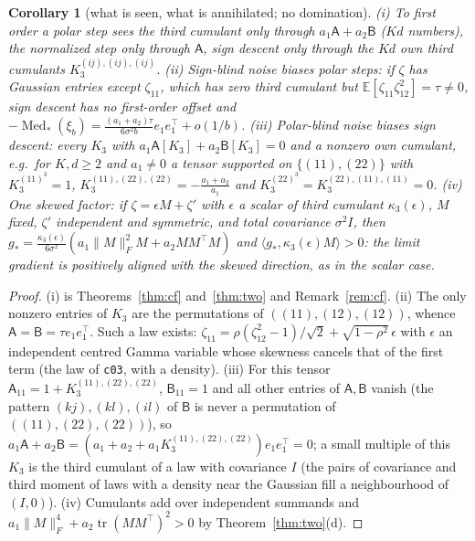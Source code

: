 \documentclass[10pt]{article}
\newtheorem{corollary}[theorem]{Corollary}
\theoremstyle{definition}
\theoremstyle{remark}
\newcommand{\E}{\mathbb{E}}
\newcommand{\nF}[1]{\|#1\|_{F}}
\newcommand{\inner}[2]{\langle #1, #2\rangle}
\newcommand{\tr}{\operatorname{tr}}
\newcommand{\Med}{\operatorname{Med}}
\newcommand{\cA}{\mathsf{A}}
\newcommand{\cB}{\mathsf{B}}
\begin{document}
\begin{corollary}[what is seen, what is annihilated; no domination]\label{cor:compare}
(i) To first order a polar step sees the third cumulant only through $a_1\cA+a_2\cB$ ($Kd$ numbers), the normalized step
only through $\cA$, sign descent only through the $Kd$ own third cumulants $K_3^{(ij),(ij),(ij)}$. (ii) \emph{Sign-blind
noise biases polar steps:} if $\zeta$ has Gaussian entries except $\zeta_{11}$, which has zero third cumulant but
$\E[\zeta_{11}\zeta_{12}^2]=\tau\ne0$, sign descent has no first-order offset and
$-\Med_\ast(\xi_b)=\frac{(a_1+a_2)\tau}{6\sigma^2b}e_1e_1^\top+o(1/b)$. (iii) \emph{Polar-blind noise biases sign descent:}
every $K_3$ with $a_1\cA[K_3]+a_2\cB[K_3]=0$ and a nonzero own cumulant, e.g.\ for $K,d\ge2$ and $a_1\ne0$ a tensor supported on
$\{(11),(22)\}$ with $K_3^{(11)^3}=1$, $K_3^{(11),(22),(22)}=-\frac{a_1+a_2}{a_1}$ and $K_3^{(22)^3}=K_3^{(22),(11),(11)}=0$.
(iv) \emph{One skewed factor:} if $\zeta=\epsilon M+\zeta'$ with $\epsilon$ a scalar of third cumulant $\kappa_3(\epsilon)$,
$M$ fixed, $\zeta'$ independent and symmetric, and total covariance $\sigma^2I$, then
$g_\ast=\frac{\kappa_3(\epsilon)}{6\sigma^2}(a_1\nF M^2M+a_2MM^\top M)$ and $\inner{g_\ast}{\kappa_3(\epsilon)M}>0$: the limit
gradient is positively aligned with the skewed direction, as in the scalar case.
\end{corollary}
\begin{proof}
(i) is Theorems~\ref{thm:cf} and~\ref{thm:two} and Remark~\ref{rem:cf}. (ii) The only nonzero entries of $K_3$ are the
permutations of $((11),(12),(12))$, whence $\cA=\cB=\tau e_1e_1^\top$. Such a law exists:
$\zeta_{11}=\rho(\zeta_{12}^2-1)/\sqrt2+\sqrt{1-\rho^2}\,\epsilon$ with $\epsilon$ an independent centred Gamma variable
whose skewness cancels that of the first term (the law of \texttt{c03}, with a density). (iii) For this tensor
$\cA_{11}=1+K_3^{(11),(22),(22)}$, $\cB_{11}=1$ and all other entries of $\cA,\cB$ vanish (the pattern
$(kj),(kl),(il)$ of $\cB$ is never a permutation of $((11),(22),(22))$), so
$a_1\cA+a_2\cB=(a_1+a_2+a_1K_3^{(11),(22),(22)})e_1e_1^\top=0$; a small multiple of this $K_3$ is the third cumulant of a law with
covariance $I$ (the pairs of covariance and third moment of laws with a density near the Gaussian fill a neighbourhood
of $(I,0)$). (iv) Cumulants add over independent summands and
$a_1\nF M^4+a_2\tr(MM^\top)^2>0$ by Theorem~\ref{thm:two}(d).
\end{proof}
\end{document}
